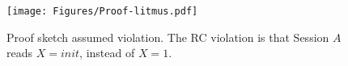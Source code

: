 \begin{figure}[t]
  \centering
  \texttt{[image: Figures/Proof-litmus.pdf]}
  \caption{Proof sketch assumed violation. The RC violation is that Session $A$ reads $X = init$, instead of $X=1$.  }
  \label{fig:proof}
\end{figure}